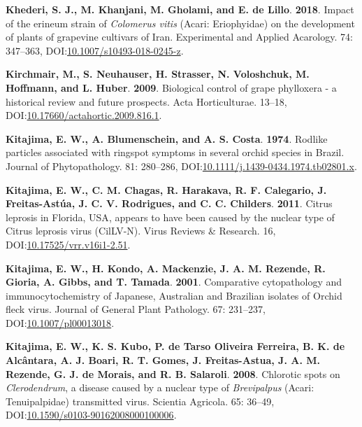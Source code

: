 \documentclass[12pt,final,CPage]{ufthesis}
\newlength{\cslhangindent}
\newenvironment{CSLReferences}[2] %
{%
	\setlength{\parindent}{0pt}
	\ifodd #1 \everypar{\setlength{\hangindent}{\cslhangindent}}\ignorespaces\fi
	\ifnum #2 > 0
	\setlength{\parskip}{#2\baselineskip}
	\fi
}%
{}
\begin{document}
{\begin{CSLReferences}{1}{0}
  \leavevmode{}%
  \textbf{Khederi, S. J., M. Khanjani, M. Gholami, and E. de Lillo}. \textbf{2018}. Impact of the erineum strain of {\emph{Colomerus vitis}} ({Acari}: {Eriophyidae}) on the development of plants of grapevine cultivars of {Iran}. Experimental and Applied Acarology. 74: 347--363, DOI:\href{https://doi.org/10.1007/s10493-018-0245-z}{10.1007/s10493-018-0245-z}.

  \leavevmode{}%
  \textbf{Kirchmair, M., S. Neuhauser, H. Strasser, N. Voloshchuk, M. Hoffmann, and L. Huber}. \textbf{2009}. Biological control of grape phylloxera - a historical review and future prospects. Acta Horticulturae. 13--18, DOI:\href{https://doi.org/10.17660/actahortic.2009.816.1}{10.17660/actahortic.2009.816.1}.

  \leavevmode{}%
  \textbf{Kitajima, E. W., A. Blumenschein, and A. S. Costa}. \textbf{1974}. Rodlike particles associated with ringspot symptoms in several orchid species in {Brazil}. Journal of Phytopathology. 81: 280--286, DOI:\href{https://doi.org/10.1111/j.1439-0434.1974.tb02801.x}{10.1111/j.1439-0434.1974.tb02801.x}.

  \leavevmode{}%
  \textbf{Kitajima, E. W., C. M. Chagas, R. Harakava, R. F. Calegario, J. Freitas-Astúa, J. C. V. Rodrigues, and C. C. Childers}. \textbf{2011}. {Citrus leprosis} in {Florida}, {USA}, appears to have been caused by the nuclear type of {Citrus leprosis virus} ({CilLV-N}). Virus Reviews {\&} Research. 16, DOI:\href{https://doi.org/10.17525/vrr.v16i1-2.51}{10.17525/vrr.v16i1-2.51}.

  \leavevmode{}%
  \textbf{Kitajima, E. W., H. Kondo, A. Mackenzie, J. A. M. Rezende, R. Gioria, A. Gibbs, and T. Tamada}. \textbf{2001}. Comparative cytopathology and immunocytochemistry of {Japanese}, {Australian} and {Brazilian} isolates of {Orchid fleck virus}. Journal of General Plant Pathology. 67: 231--237, DOI:\href{https://doi.org/10.1007/pl00013018}{10.1007/pl00013018}.

  \leavevmode{}%
  \textbf{Kitajima, E. W., K. S. Kubo, P. de Tarso Oliveira Ferreira, B. K. de Alcântara, A. J. Boari, R. T. Gomes, J. Freitas-Astua, J. A. M. Rezende, G. J. de Morais, and R. B. Salaroli}. \textbf{2008}. Chlorotic spots on {\emph{Clerodendrum}}, a disease caused by a nuclear type of {\emph{Brevipalpus}} ({Acari}: {Tenuipalpidae}) transmitted virus. Scientia Agricola. 65: 36--49, DOI:\href{https://doi.org/10.1590/s0103-90162008000100006}{10.1590/s0103-90162008000100006}.


\end{CSLReferences}}
\end{document}

